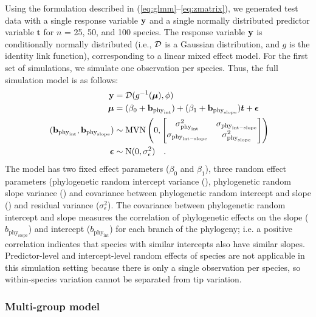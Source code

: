 \documentclass[12pt]{article}
\begin{document}
Using the formulation described in (\ref{eq:glmm}--\ref{eq:zmatrix}), we generated test data with a single response variable ${\mathbf y}$ and a single normally distributed predictor variable $\bm{t}$ for $n$ = 25, 50, and 100 species.
The response variable ${\mathbf y}$ is conditionally normally distributed (i.e., $\cal{D}$ is a Gaussian distribution, and $g$ is the identity link function), corresponding to a linear mixed effect model. 
For the first set of simulations, we simulate one observation per species.
Thus, the full simulation model is as follows:
\begin{equation}
\begin{aligned}
{\mathbf y} & = {\cal D}(g^{-1}({\boldsymbol \mu}), \phi) \\
{\boldsymbol \mu} & = (\beta_0 + {\bf b}_{\mathrm{phy}_{\mathrm{int}}}) + (\beta_1 + {\bf b}_{\mathrm{phy}_{\mathrm{slope}}}) \bm{t} + {\boldsymbol \epsilon} \\\
({\bf b}_{\mathrm{phy}_{\mathrm{int}}}, {\bf b}_{\mathrm{phy}_{\mathrm{slope}}}) & \sim \textrm{MVN} \left( 0, \begin{bmatrix}
\sigma^2_{\mathrm{phy}_\mathrm{int}} & \sigma_{\mathrm{phy}_\mathrm{int-slope}} \\ 
\sigma_{\mathrm{phy}_\mathrm{int-slope}} & \sigma^2_{\mathrm{phy}_\mathrm{slope}}
\end{bmatrix} 
\right) \\ 
{\boldsymbol \epsilon} & \sim \textrm{N} ( 0 , \sigma_{\epsilon}^2) \quad.
\label{eq:single_glmm}
\end{aligned}
\end{equation}
The model has two fixed effect parameters ($\beta_0$ and $\beta_1$), three random effect parameters (phylogenetic random intercept variance (), phylogenetic random slope variance () and covariance between phylogenetic random intercept and slope () and residual variance ($\sigma_{\epsilon}^2$).  
The covariance between phylogenetic random intercept and slope measures the correlation of phylogenetic effects on the slope ($b_{\mathrm{phy_{slope}}}$) and intercept ($b_{\mathrm{phy_{int}}}$) for each branch of the phylogeny; i.e. a positive correlation indicates that species with similar intercepts also have similar slopes.
Predictor-level and intercept-level random effects of species are not applicable in this simulation setting because there is only a single observation per species, so within-species variation cannot be separated from tip variation.

\subsubsection*{Multi-group model}
\end{document}
